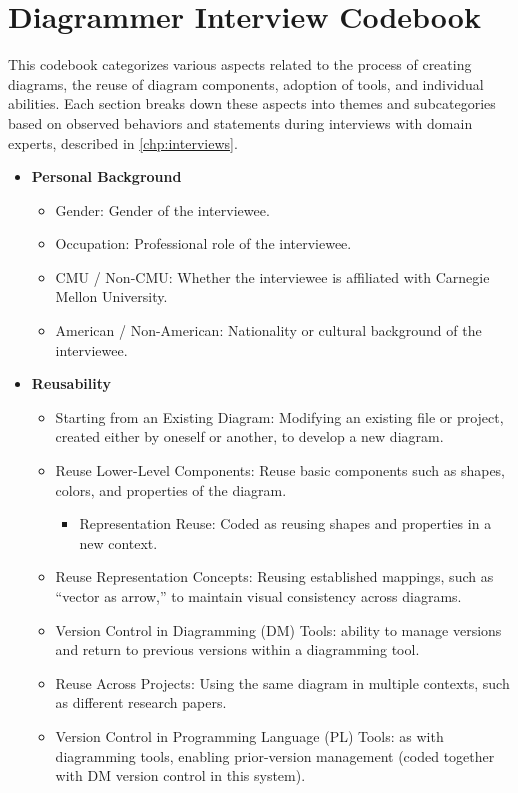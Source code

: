 \chapter{Diagrammer Interview Codebook}
\label{app:interview-codebook}

This codebook categorizes various aspects related to the process of creating diagrams, the reuse of diagram components, adoption of tools, and individual abilities. Each section breaks down these aspects into themes and subcategories based on observed behaviors and statements during interviews with domain experts, described in \cref{chp:interviews}.

\begin{itemize}
    \item \textbf{Personal Background}
    \begin{itemize}
        \item Gender: Gender of the interviewee.
        \item Occupation: Professional role of the interviewee.
        \item CMU / Non-CMU: Whether the interviewee is affiliated with Carnegie Mellon University.
        \item American / Non-American: Nationality or cultural background of the interviewee.
    \end{itemize}

    \item \textbf{Reusability}
    \begin{itemize}
        \item Starting from an Existing Diagram: Modifying an existing file or project, created either by oneself or another, to develop a new diagram.
        \item Reuse Lower-Level Components: Reuse basic components such as shapes, colors, and properties of the diagram.
        \begin{itemize}
            \item Representation Reuse: Coded as reusing shapes and properties in a new context.
        \end{itemize}
        \item Reuse Representation Concepts: Reusing established mappings, such as ``vector as arrow,'' to maintain visual consistency across diagrams.
        \item Version Control in Diagramming (DM) Tools: ability to manage versions and return to previous versions within a diagramming tool.
        \item Reuse Across Projects: Using the same diagram in multiple contexts, such as different research papers.
        \item Version Control in Programming Language (PL) Tools: as with diagramming tools, enabling prior-version management (coded together with DM version control in this system).
    \end{itemize}


\end{itemize}
